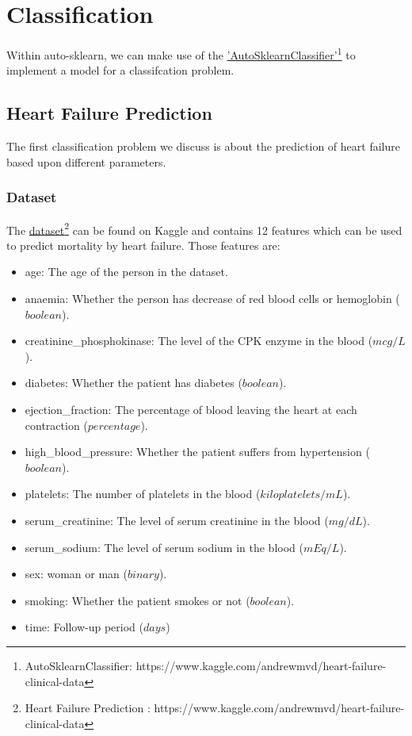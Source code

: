 \chapter{Classification}
\newcommand{\linkAutoSklearnClassifier}{https://www.kaggle.com/andrewmvd/heart-failure-clinical-data}

Within auto-sklearn, we can make use of the \href{\linkAutoSklearnClassifier}{'AutoSklearnClassifier'\footnote{AutoSklearnClassifier: \href{\linkAutoSklearnClassifier}{\linkAutoSklearnClassifier}}} to implement a model for a classifcation problem.

\section{Heart Failure Prediction}

The first classification problem we discuss is about the prediction of heart failure based upon different parameters.

\subsection{Dataset}
\newcommand{\kagglelinkheartfailure}{https://www.kaggle.com/andrewmvd/heart-failure-clinical-data}

The \href{\kagglelinkheartfailure}{dataset\footnote{Heart Failure Prediction : \href{\kagglelinkheartfailure}{\kagglelinkheartfailure}}} can be found on Kaggle and contains 12 features which can be used to predict mortality by heart failure. Those features are:

\begin{itemize}
  \item age: The age of the person in the dataset.
  \item anaemia: Whether the person has decrease of red blood cells or hemoglobin ($boolean$).
  \item creatinine\_phosphokinase: The level of the CPK enzyme in the blood ($mcg/L$).
  \item diabetes: Whether the patient has diabetes ($boolean$).
  \item ejection\_fraction: The percentage of blood leaving the heart at each contraction ($percentage$).
  \item high\_blood\_pressure: Whether the patient suffers from hypertension ($boolean$).
  \item platelets: The number of platelets in the blood ($kiloplatelets/mL$).
  \item serum\_creatinine: The level of serum creatinine in the blood ($mg/dL$).
  \item serum\_sodium: The level of serum sodium in the blood ($mEq/L$).
  \item sex: woman or man ($binary$).
  \item smoking: Whether the patient smokes or not ($boolean$).
  \item time: Follow-up period ($days$)
\end{itemize}

